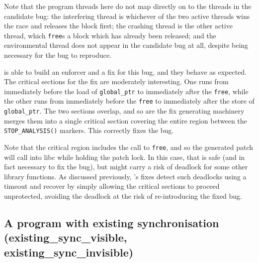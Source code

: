 Note that the program threads here do not map directly on to the
threads in the candidate bug: the interfering thread is whichever of
the two active threads wins the race and releases the block first; the
crashing thread is the other active thread, which \texttt{free}s a
block which has already been released; and the environmental thread
does not appear in the candidate bug at all, despite being necessary
for the bug to reproduce.

{\Implementation} is able to build an enforcer and a fix for this bug,
and they behave as expected.  The critical sections for the fix are
moderately interesting.  One runs from immediately before the load of
\texttt{global\_ptr} to immediately after the \texttt{free}, while the
other runs from immediately before the \texttt{free} to immediately
after the store of \texttt{global\_ptr}.  The two sections overlap,
and so are the fix generating machinery merges them into a single
critical section covering the entire region between the
\texttt{STOP\_ANALYSIS()} markers.  This correctly fixes the bug.

Note that the critical region includes the call to \texttt{free}, and
so the generated patch will call into libc while holding the patch
lock.  In this case, that is safe (and in fact necessary to fix the
bug), but might carry a risk of deadlock for some other library
functions.  As discussed previously, {\technique}'s fixes detect such
deadlocks using a timeout and recover by simply allowing the critical
sections to proceed unprotected, avoiding the deadlock at the risk of
re-introducing the fixed bug.

\subsection{A program with existing synchronisation (existing\_sync\_visible, existing\_sync\_invisible)}

